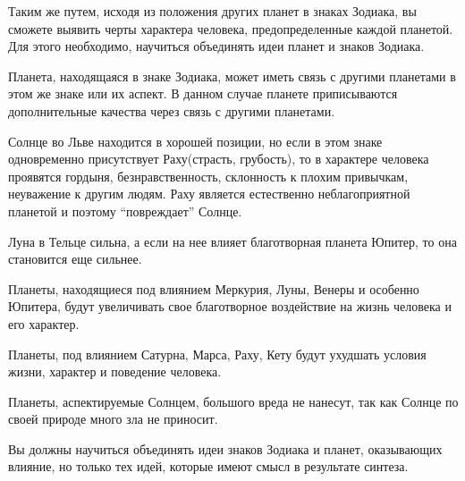 Таким же путем, исходя из положения других планет в знаках Зодиака, вы сможете выявить черты характера человека, предопределенные каждой планетой. Для этого необходимо, научиться объединять идеи планет и знаков Зодиака.

Планета, находящаяся в знаке Зодиака, может иметь связь с другими планетами в этом же знаке или их аспект. В данном случае планете приписываются дополнительные качества через связь с другими планетами.

Солнце во Льве находится в хорошей позиции, но если в этом знаке одновременно присутствует Раху(страсть, грубость), то в характере человека проявятся гордыня, безнравственность, склонность к плохим привычкам, неуважение к другим людям. Раху является естественно неблагоприятной планетой и поэтому ``повреждает'' Солнце.

Луна в Тельце сильна, а если на нее влияет благотворная планета Юпитер, то она становится еще сильнее.

Планеты, находящиеся под влиянием Меркурия, Луны, Венеры и особенно Юпитера, будут увеличивать свое благотворное воздействие на жизнь человека и его характер.

Планеты, под влиянием Сатурна, Марса, Раху, Кету будут ухудшать условия жизни, характер и поведение человека.

Планеты, аспектируемые Солнцем, большого вреда не нанесут, так как Солнце по своей природе много зла не приносит.

Вы должны научиться объединять идеи знаков Зодиака и планет, оказывающих влияние, но только тех идей, которые имеют смысл в результате синтеза.
